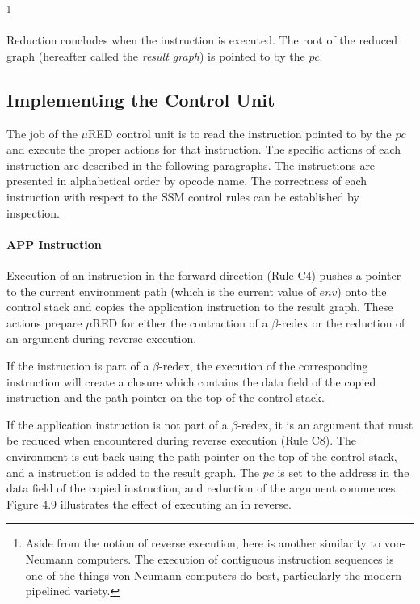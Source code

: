 \footnote{Aside from the notion of reverse execution, here is another similarity to von-Neumann computers. The execution of contiguous instruction sequences is one of the things von-Neumann computers do best, particularly the modern pipelined variety.}


Reduction concludes when the  instruction is executed. The root of the reduced graph (hereafter called the \emph{result graph}) is pointed to by the \(pc\).

\subsection{Implementing the Control Unit}

The job of the \(\mu\)RED control unit is to read the instruction pointed to by the \(pc\) and execute the proper actions for that instruction. The specific actions of each instruction are described in the following paragraphs. The instructions are presented in alphabetical order by opcode name. The correctness of each instruction with respect to the SSM control rules can be established by inspection.

\paragraph{APP Instruction}

Execution of an  instruction in the forward direction (Rule C4) pushes a pointer to the current environment path (which is the current value of \(env\)) onto the control stack and copies the application instruction to the result graph. These actions prepare \(\mu\)RED for either the contraction of a \(\beta\)-redex or the reduction of an argument during reverse execution.

If the  instruction is part of a \(\beta\)-redex, the execution of the corresponding  instruction will create a closure which contains the data field of the copied  instruction and the path pointer on the top of the control stack.

If the application instruction is not part of a \(\beta\)-redex, it is an argument that must be reduced when encountered during reverse execution (Rule C8). The environment is cut back using the path pointer on the top of the control stack, and a  instruction is added to the result graph. The \(pc\) is set to the address in the data field of the copied  instruction, and reduction of the argument commences. Figure 4.9 illustrates the effect of executing an  in reverse.

